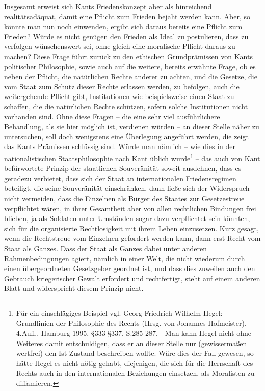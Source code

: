 \documentclass[12pt,a4paper,ngerman]{article}
\begin{document}
Insgesamt erweist sich Kants Friedenskonzept aber als hinreichend
realitätsadäquat, damit eine Pflicht zum Frieden bejaht werden kann.
Aber, so könnte man nun noch einwenden, ergibt sich daraus bereits
eine Pflicht zum Frieden? Würde es nicht genügen den Frieden als Ideal
zu postulieren, dass zu verfolgen wünschenswert sei, ohne gleich eine
moralische Pflicht daraus zu machen? Diese Frage führt zurück zu den
ethischen Grundprämissen von Kants politischer Philosophie, sowie auch
auf die weitere, bereits erwähnte Frage, ob es neben der Pflicht, die
natürlichen Rechte anderer zu achten, und die Gesetze, die vom Staat
zum Schutz dieser Rechte erlassen werden, zu befolgen, auch die
weitergehende Pflicht gibt, Institutionen wie beispielsweise einen
Staat zu schaffen, die die natürlichen Rechte schützen, sofern solche
Institutionen nicht vorhanden sind. Ohne diese Fragen -- die eine sehr
viel ausführlichere Behandlung, als sie hier möglich ist, verdienen
würden -- an dieser Stelle näher zu untersuchen, soll doch wenigstens
eine Überlegung angeführt werden, die zeigt das Kants Prämissen
schlüssig sind. Würde man nämlich -- wie dies in der nationalistischen
Staatsphilosophie nach Kant üblich wurde\footnote{Für ein
  einschlägiges Beispiel vgl. Georg Friedrich Wilhelm Hegel:
  Grundlinien der Philosophie des Rechts (Hrsg. von Johannes
  Hofmeister), 4.Aufl., Hamburg 1995, §333-§337, S.285-287. - Man kann
  Hegel nicht ohne Weiteres damit entschuldigen, dass er an dieser
  Stelle nur (gewissermaßen wertfrei) den Ist-Zustand beschreiben
  wollte. Wäre dies der Fall gewesen, so hätte Hegel es nicht nötig
  gehabt, diejenigen, die sich für die Herrschaft des Rechts auch in
  den internationalen Beziehungen einsetzen, als Moralisten zu
  diffamieren.} -- das auch von Kant befürwortete Prinzip der
staatlichen Souveränität soweit ausdehnen, dass es geradezu verbietet,
dass sich der Staat an internationalen Friedensregimen beteiligt, die
seine Souveränität einschränken, dann ließe sich der Widerspruch nicht
vermeiden, dass die Einzelnen als Bürger des Staates zur Gesetzestreue
verpflichtet wären, in ihrer Gesamtheit aber von allen rechtlichen
Bindungen frei blieben, ja als Soldaten unter Umständen sogar dazu
verpflichtet sein könnten, sich für die organisierte Rechtlosigkeit
mit ihrem Leben einzusetzen. Kurz gesagt, wenn die Rechtstreue vom
Einzelnen gefordert werden kann, dann erst Recht vom Staat als Ganzes.
Dass der Staat als Ganzes dabei unter anderen Rahmenbedingungen
agiert, nämlich in einer Welt, die nicht wiederum durch einen
übergeordneten Gesetzgeber geordnet ist, und dass dies zuweilen auch
den Gebrauch kriegerischer Gewalt erfordert und rechtfertigt, steht
auf einem anderen Blatt und widerspricht diesem Prinzip nicht.
\end{document}
